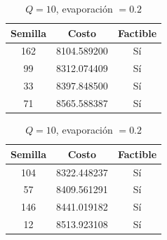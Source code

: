 \documentclass{article}
\begin{document}
    \begin{table}[H]
      \begin{minipage}{0.5\linewidth}
        \centering
        \caption{$Q=1$, evaporación $= 0.2$}
        \begin{tabular}{c c c}
          \hline
          Semilla & Costo & Factible \\
          \hline
          162     & 8104.589200 & Sí \\
          99      & 8312.074409 & Sí \\
          33      & 8397.848500 & Sí \\
          71      & 8565.588387 & Sí \\
        \end{tabular}
      \end{minipage}
      \begin{minipage}{0.5\linewidth}
        \centering
        \caption{$Q=10$, evaporación $= 0.2$}
        \begin{tabular}{c c c}
          \hline
          Semilla & Costo & Factible   \\
          \hline
          104     & 8322.448237  & Sí  \\
          57      & 8409.561291  & Sí  \\
          146     & 8441.019182  & Sí  \\
          12      & 8513.923108  & Sí  \\
        \end{tabular}
      \end{minipage}
    \end{table}
\end{document}
